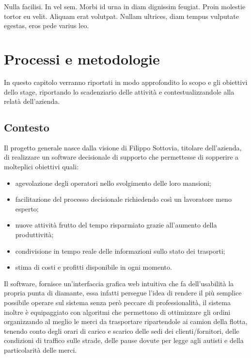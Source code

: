 \begin{savequote}[75mm]
Nulla facilisi. In vel sem. Morbi id urna in diam dignissim feugiat. Proin molestie tortor eu velit. Aliquam erat volutpat. Nullam ultrices, diam tempus vulputate egestas, eros pede varius leo.
\end{savequote}
\hypertarget{(chap:processi_metodologie)}{}
\chapter{Processi e metodologie}
In questo capitolo verranno riportati in modo approfondito lo scopo e gli obiettivi dello stage, riportando lo scadenziario delle attività e contestualizzandole alla relatà dell'azienda.

\section{Contesto}
Il progetto generale nasce dalla visione di Filippo Sottovia, titolare dell'azienda, di realizzare un software decisionale di supporto che permettesse di sopperire a molteplici obiettivi quali:
\begin{itemize}
    \item agevolazione degli operatori nello svolgimento delle loro mansioni;
    \item facilitazione del processo decisionale richiedendo così un lavoratore meno esperto;
    \item nuove attività frutto del tempo risparmiato grazie all'aumento della produttività;
    \item condivisione in tempo reale delle informazioni sullo stato dei trasporti;
    \item stima di costi e profitti disponibile in ogni momento.
\end{itemize}
\noindent Il software, fornisce un'interfaccia grafica web intuitiva che fa dell'usabilità la propria punta di diamante, essa infatti persegue l'idea di rendere il più semplice possibile operare sul sistema senza però peccare di professionalità, il sistema inoltre è equipaggiato con algoritmi che permettono di ottimizzare gli ordini organizzando al meglio le merci da trasportare ripartendole ai camion della flotta, tenendo conto degli orari di carico e scarico delle sedi dei clienti/fornitori, delle condizioni di traffico sulle strade, delle pause dovute per legge agli autisti e della particolarità delle merci.

